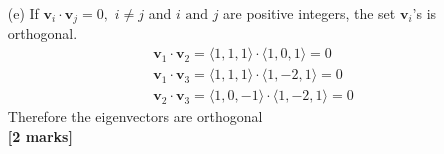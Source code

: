 \documentclass[12pt]{exam}
\newcommand{\vv}{\mathbf{v}}
\begin{document}
\begin{questions}
\begin{solution}
\begin{enumerate}
	\item[(e)] If $\vv_i\cdot\vv_j=0,$ $i\neq j$ and $i\text{ and } j$ are positive integers, the set $\vv_i$'s is orthogonal.
	\begin{align*}
	&\vv_1\cdot\vv_2=\langle 1, 1, 1\rangle\cdot\langle 1, 0, 1\rangle = 0\\
	&\vv_1\cdot\vv_3=\langle 1, 1, 1\rangle\cdot\langle 1, -2, 1\rangle = 0\\
	&\vv_2\cdot\vv_3=\langle 1, 0, -1\rangle\cdot\langle 1, -2, 1\rangle = 0
	\end{align*}
	Therefore the eigenvectors are orthogonal \\
	\hfill \textbf{[2 marks]}
\end{enumerate}
\end{solution}




\end{questions}
\end{document}
